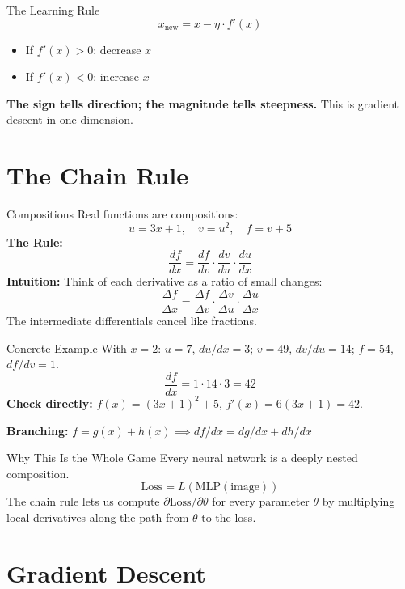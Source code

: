 \documentclass[10pt]{beamer}
\begin{document}
\begin{frame}{The Learning Rule}
    \[
        x_{\text{new}} = x - \eta \cdot f'(x)
    \]
    \begin{itemize}
        \item If $f'(x) > 0$: decrease $x$
        \item If $f'(x) < 0$: increase $x$
    \end{itemize}
    \textbf{The sign tells direction; the magnitude tells steepness.}
    This is gradient descent in one dimension.
\end{frame}

\section{The Chain Rule}

\begin{frame}{Compositions}
    Real functions are compositions:
    \[
        u = 3x + 1, \quad v = u^2, \quad f = v + 5
    \]
    \textbf{The Rule:}
    \[
        \frac{df}{dx} = \frac{df}{dv} \cdot \frac{dv}{du} \cdot \frac{du}{dx}
    \]
    \textbf{Intuition:} Think of each derivative as a ratio of small changes:
    \[
        \frac{\Delta f}{\Delta x} = \frac{\Delta f}{\Delta v} \cdot \frac{\Delta v}{\Delta u} \cdot \frac{\Delta u}{\Delta x}
    \]
    The intermediate differentials cancel like fractions.
\end{frame}

\begin{frame}{Concrete Example}
    With $x = 2$: $u = 7$, $du/dx = 3$; $v = 49$, $dv/du = 14$; $f = 54$, $df/dv = 1$.
    \[
        \frac{df}{dx} = 1 \cdot 14 \cdot 3 = 42
    \]
    \textbf{Check directly:} $f(x) = (3x+1)^2 + 5$, $f'(x) = 6(3x+1) = 42$. \checkmark

    \textbf{Branching:} $f = g(x) + h(x) \implies df/dx = dg/dx + dh/dx$
\end{frame}

\begin{frame}{Why This Is the Whole Game}
    Every neural network is a deeply nested composition.
    \[
        \text{Loss} = L(\text{MLP}(\text{image}))
    \]
    The chain rule lets us compute $\partial\text{Loss}/\partial\theta$ for every parameter $\theta$ by multiplying local derivatives along the path from $\theta$ to the loss.
\end{frame}

\section{Gradient Descent}
\end{document}
